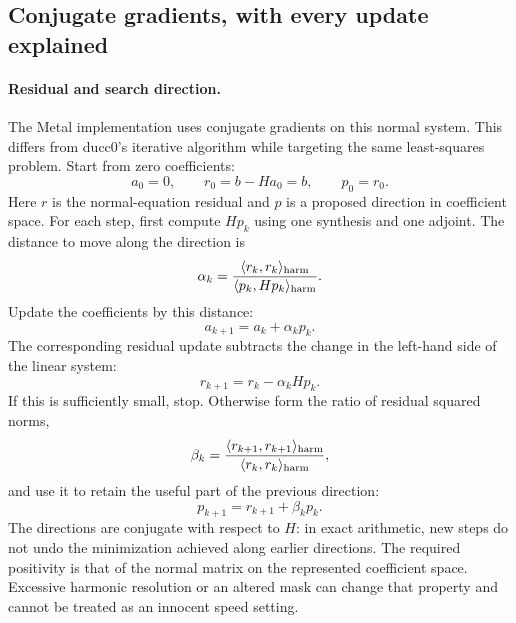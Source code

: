 \subsection{Conjugate gradients, with every update explained}

\paragraph{Residual and search direction.}
The Metal implementation uses conjugate gradients on this normal system.
This differs from ducc0's iterative algorithm while targeting the same
least-squares problem. Start from zero coefficients:
\begin{equation}
 a_0=0,\qquad r_0=b-Ha_0=b,\qquad p_0=r_0.
\end{equation}
Here $r$ is the normal-equation residual and $p$ is a proposed direction
in coefficient space. For each step, first compute $Hp_k$ using one
synthesis and one adjoint. The distance to move along the direction is
\begin{equation}
 \alpha_k=\frac{\langle r_k,r_k\rangle_{\rm harm}}
 {\langle p_k,Hp_k\rangle_{\rm harm}}.
\end{equation}
Update the coefficients by this distance:
\begin{equation}
 a_{k+1}=a_k+\alpha_k p_k.
\end{equation}
The corresponding residual update subtracts the change in the left-hand
side of the linear system:
\begin{equation}
 r_{k+1}=r_k-\alpha_k Hp_k.
\end{equation}
If this is sufficiently small, stop. Otherwise form the ratio of residual
squared norms,
\begin{equation}
 \beta_k=\frac{\langle r_{k+1},r_{k+1}\rangle_{\rm harm}}
 {\langle r_k,r_k\rangle_{\rm harm}},
\end{equation}
and use it to retain the useful part of the previous direction:
\begin{equation}
 p_{k+1}=r_{k+1}+\beta_k p_k.
\end{equation}
The directions are conjugate with respect to $H$: in exact arithmetic,
new steps do not undo the minimization achieved along earlier directions.
The required positivity is that of the normal matrix on the represented
coefficient space. Excessive harmonic resolution or an altered mask can
change that property and cannot be treated as an innocent speed setting.

